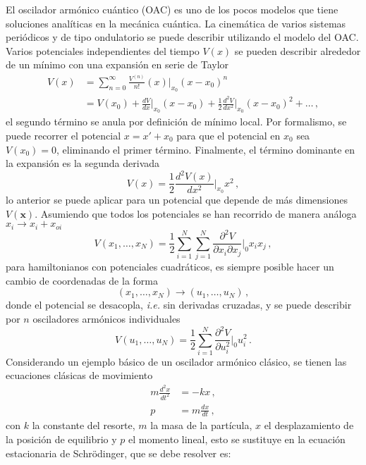 El oscilador armónico cuántico (OAC) es uno de los pocos modelos que tiene soluciones analíticas en la mecánica cuántica. La cinemática de varios sistemas periódicos y de tipo ondulatorio se puede describir utilizando el modelo del OAC.
Varios potenciales independientes del tiempo $V(x)$ se pueden describir alrededor de un mínimo con una expansión en serie de Taylor
\begin{align}
  V(x) & = \sum_{n=0}^{\infty} \frac{V^{(n)}}{n!} (x)|_{x_0} (x-x_0)^n \\ &= V(x_0) + \frac{dV}{dx}\Big|_{x_0} (x-x_0) + \frac{1}{2}\frac{d^2V}{dx^2}\Big|_{x_0} (x-x_0)^2 + \dots \,,
\end{align}
el segundo término se anula por definición de mínimo local. Por formalismo, se puede recorrer el potencial $x = x' + x_0$ para que el potencial en $x_0$ sea $V(x_0) = 0$, eliminando el primer término. Finalmente, el término dominante en la expansión es la segunda derivada
\begin{equation}
  \label{OA.1}
  V(x) = \frac{1}{2}\frac{d^2V(x)}{dx^2}\Big|_{x_0}x^2 \,,
\end{equation}
lo anterior se puede aplicar para un potencial que depende de más dimensiones $V(\mathbf{x})$. Asumiendo que todos los potenciales se han recorrido de manera análoga $x_i \to x_i + x_{oi}$
\begin{equation}
  V(x_1, \dots, x_N) = \frac{1}{2}\sum_{i=1}^N \sum_{j=1}^N \frac{\partial^2 V}{\partial x_i \partial x_j}\Big|_{0} x_i x_j \,,
\end{equation}
para hamiltonianos con potenciales cuadráticos, es siempre posible hacer un cambio de coordenadas de la forma
\begin{equation}
  (x_{1}, \dots, x_N) \to (u_1, \dots, u_N)\,,
\end{equation}
donde el potencial se desacopla, \textit{i.e.} sin derivadas cruzadas, y se puede describir por $n$ osciladores armónicos individuales
\begin{equation}
  V(u_1, \dots, u_N) = \frac{1}{2} \sum_{i=1}^{N} \frac{\partial^2 V}{\partial u_i^{2}}\Big|_0 u_i^2\,.
\end{equation}
Considerando un ejemplo básico de un oscilador armónico clásico, se tienen las ecuaciones clásicas de movimiento
\begin{align}
  m \frac{d^2x}{dt^2} & = -kx \,, \label{OA.2}            \\
  p                   & = m\frac{dx}{dt} \,, \label{OA.3}
\end{align}
con $k$ la constante del resorte, $m$ la masa de la partícula, $x$ el desplazamiento de la posición de equilibrio y $p$ el momento lineal, esto se sustituye en la ecuación estacionaria de Schrödinger, que se debe resolver es:
